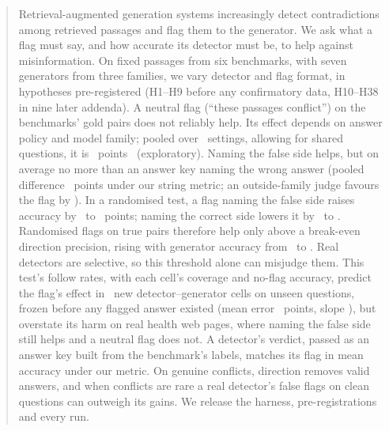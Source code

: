 \begin{abstract}
Retrieval-augmented generation systems increasingly detect contradictions among retrieved passages and flag them to
the generator. We ask what a flag must say, and how accurate its detector must be, to help against
misinformation. On fixed passages from six benchmarks, with seven generators from three families, we vary
detector and flag format, in hypotheses pre-registered (H1--H9 before any confirmatory data,
H10--H38 in nine later addenda). A neutral flag (``these passages conflict'') on the benchmarks' gold pairs does not reliably
help. Its effect depends on answer policy and model family; pooled over \neuMlK\ settings, allowing
for shared questions, it is \neuMlMu\ points \neuMlCI\ (exploratory). Naming the false side helps, but on average no more than
an answer key naming the wrong answer (pooled difference \PoolTwentyThree\ points under our string metric; an outside-family judge favours the flag by \jdTwentyThreeJ). In a
randomised test, a flag naming the false side raises accuracy by \hThirtyOneAMin\ to \hThirtyOneAMax\ points; naming the correct side lowers it by
\ahThirtyOneBMax\ to \ahThirtyOneBMin. Randomised flags on true pairs therefore help only above a break-even direction
precision, rising with generator accuracy from \beMin\ to \beMax. Real detectors are selective, so this
threshold alone can misjudge them. This test's follow rates, with each cell's coverage and no-flag
accuracy, predict the flag's effect in \frN\ new detector--generator cells on unseen questions, frozen before any
flagged answer existed (mean error \frMae\ points, slope \frSlope), but overstate its harm on real health web pages, where
naming the false side still helps and a neutral flag does not. A detector's verdict, passed as an answer key built from the benchmark's labels, matches its flag in mean
accuracy under our metric. On genuine
conflicts, direction removes valid answers, and when conflicts are rare a real detector's false flags on clean
questions can outweigh its gains. We release the harness, pre-registrations and every run.
\end{abstract}
